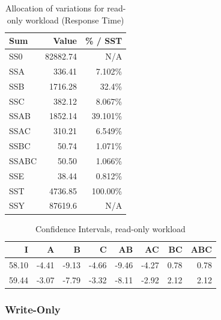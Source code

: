\documentclass[11pt,a4paper]{article}
\begin{document}
\begin{table}[!htb]
  \centering
    \caption{Allocation of variations for read-only workload (Response Time)}
  \label{tab:wo_variation}
  \small{
    \begin{tabular}{|l|r|r|}
        \hline \textbf{Sum}        & \textbf{Value}        & \textbf{\% / SST} \\
      \hline SS0   & 82882.74      & N/A      \\
      \hline SSA   & 336.41        & 7.102\%  \\
      \hline SSB   & 1716.28       & 32.4\% \\
      \hline SSC   & 382.12        & 8.067\% \\
      \hline SSAB  & 1852.14       & 39.101\%  \\
      \hline SSAC  & 310.21        & 6.549\%  \\
      \hline SSBC  & 50.74         & 1.071\%  \\
      \hline SSABC & 50.50         & 1.066\%  \\
      \hline SSE   & 38.44         & 0.812\%  \\
      \hline SST   & 4736.85       & 100.00\% \\
      \hline SSY   & 87619.6       & N/A      \\
      \hline
    \end{tabular}
  }
\end{table}

\begin{table}[!htb]
\centering
    \caption{Confidence Intervals, read-only workload}
    \label{tab:2k_1_c}
    \begin{tabular}{|r|r|r|r|r|r|r|r|}
  \hline
         \textbf{I}        & \textbf{A}       & \textbf{B}       & \textbf{C}       & \textbf{AB}      & \textbf{AC}      &\textbf{BC}       & \textbf{ABC}    \\
    \hline 58.10 & -4.41 & -9.13 & -4.66 & -9.46 & -4.27 & 0.78 & 0.78 \\
    \hline 59.44 & -3.07 & -7.79 & -3.32 & -8.11 & -2.92 & 2.12 & 2.12 \\
  \hline
\end{tabular}
\end{table}

\newpage
\subsubsection*{Write-Only}
\end{document}
